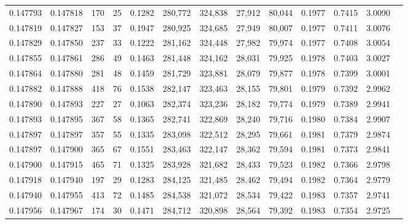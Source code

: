 \begin{tabular}{rrrrrrrrrrrrr}
0.147793 & 0.147818 &   170 &  25 &                                     0.1282 & 280,772 & 324,838 &  27,912 &  80,044 & 0.1977 & 0.7415 & 3.0090 \\
0.147819 & 0.147827 &   153 &  37 &                                     0.1947 & 280,925 & 324,685 &  27,949 &  80,007 & 0.1977 & 0.7411 & 3.0076 \\
0.147829 & 0.147850 &   237 &  33 &                                     0.1222 & 281,162 & 324,448 &  27,982 &  79,974 & 0.1977 & 0.7408 & 3.0054 \\
0.147855 & 0.147861 &   286 &  49 &                                     0.1463 & 281,448 & 324,162 &  28,031 &  79,925 & 0.1978 & 0.7403 & 3.0027 \\
0.147864 & 0.147880 &   281 &  48 &                                     0.1459 & 281,729 & 323,881 &  28,079 &  79,877 & 0.1978 & 0.7399 & 3.0001 \\
0.147882 & 0.147888 &   418 &  76 &                                     0.1538 & 282,147 & 323,463 &  28,155 &  79,801 & 0.1979 & 0.7392 & 2.9962 \\
0.147890 & 0.147893 &   227 &  27 &                                     0.1063 & 282,374 & 323,236 &  28,182 &  79,774 & 0.1979 & 0.7389 & 2.9941 \\
0.147893 & 0.147895 &   367 &  58 &                                     0.1365 & 282,741 & 322,869 &  28,240 &  79,716 & 0.1980 & 0.7384 & 2.9907 \\
0.147897 & 0.147897 &   357 &  55 &                                     0.1335 & 283,098 & 322,512 &  28,295 &  79,661 & 0.1981 & 0.7379 & 2.9874 \\
0.147897 & 0.147900 &   365 &  67 &                                     0.1551 & 283,463 & 322,147 &  28,362 &  79,594 & 0.1981 & 0.7373 & 2.9841 \\
0.147900 & 0.147915 &   465 &  71 &                                     0.1325 & 283,928 & 321,682 &  28,433 &  79,523 & 0.1982 & 0.7366 & 2.9798 \\
0.147918 & 0.147940 &   197 &  29 &                                     0.1283 & 284,125 & 321,485 &  28,462 &  79,494 & 0.1982 & 0.7364 & 2.9779 \\
0.147940 & 0.147955 &   413 &  72 &                                     0.1485 & 284,538 & 321,072 &  28,534 &  79,422 & 0.1983 & 0.7357 & 2.9741 \\
0.147956 & 0.147967 &   174 &  30 &                                     0.1471 & 284,712 & 320,898 &  28,564 &  79,392 & 0.1983 & 0.7354 & 2.9725 \\

\end{tabular}
